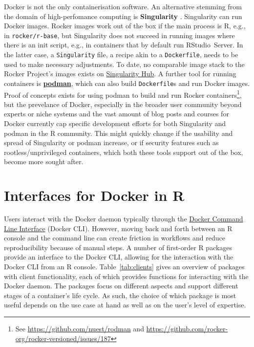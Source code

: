 Docker is not the only containerisation software. An alternative
stemming from the domain of high-perfomance computing is
\textbf{Singularity} \citep{kurtzer_singularity_2017}. Singularity can
run Docker images. Rocker images work out of the box if the main process
is R, e.g., in \texttt{rocker/r-base}, but Singularity does not succeed
in running images where there is an init script, e.g., in containers
that by default run RStudio~Server. In the latter case, a
\texttt{Singularity} file, a recipe akin to a \texttt{Dockerfile}, needs
to be used to make necessary adjustments. To date, no comparable image
stack to the Rocker Project's images exists on
\href{https://singularity-hub.org/}{Singularity Hub}. A further tool for
running containers is
\href{https://github.com/containers/libpod}{\textbf{podman}}, which can
also build \texttt{Dockerfile}s and run Docker images. Proof of concepts
exists for using podman to build and run Rocker
containers\footnote{See \href{https://github.com/nuest/rodman}{https://github.com/nuest/rodman} and \href{https://github.com/rocker-org/rocker-versioned/issues/187}{https://github.com/rocker-org/rocker-versioned/issues/187}},
but the prevelance of Docker, especially in the broader user community
beyond experts or niche systems and the vast amount of blog posts and
courses for Docker currently cap specific development efforts for both
Singularity and podman in the R community. This might quickly change if
the usability and spread of Singularity or podman increase, or if
security features such as rootless/unprivileged containers, which both
these tools support out of the box, become more sought after.

\hypertarget{interfaces-for-docker-in-r}{%
\section{Interfaces for Docker in R}\label{interfaces-for-docker-in-r}}

\label{interfaces}

Users interact with the Docker daemon typically through the
\href{https://docs.docker.com/engine/reference/commandline/cli/}{Docker
Command Line Interface} (Docker CLI). However, moving back and forth
between an R console and the command line can create friction in
workflows and reduce reproducibility because of manual steps. A number
of first-order R packages provide an interface to the Docker CLI,
allowing for the interaction with the Docker CLI from an R console.
Table~\ref{tab:clients} gives an overview of packages with client
functionality, each of which provides functions for interacting with the
Docker daemon. The packages focus on different aspects and support
different stages of a container's life cycle. As such, the choice of
which package is most useful depends on the use case at hand as well as
on the user's level of expertise.

